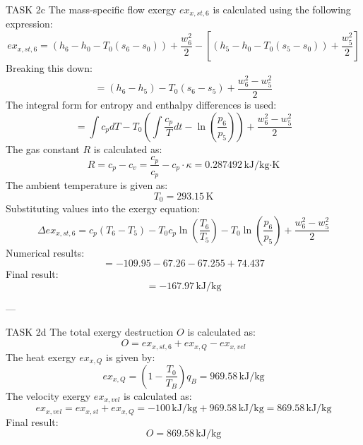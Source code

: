 TASK 2c  
The mass-specific flow exergy \( ex_{x,st,6} \) is calculated using the following expression:  
\[
ex_{x,st,6} = (h_6 - h_0 - T_0(s_6 - s_0)) + \frac{w_6^2}{2} - \left[(h_5 - h_0 - T_0(s_5 - s_0)) + \frac{w_5^2}{2}\right]
\]  
Breaking this down:  
\[
= (h_6 - h_5) - T_0(s_6 - s_5) + \frac{w_6^2 - w_5^2}{2}
\]  
The integral form for entropy and enthalpy differences is used:  
\[
= \int c_p dT - T_0 \left(\int \frac{c_p}{T} dt - \ln\left(\frac{p_6}{p_5}\right)\right) + \frac{w_6^2 - w_5^2}{2}
\]  
The gas constant \( R \) is calculated as:  
\[
R = c_p - c_v = \frac{c_p}{c_p} - c_p \cdot \kappa = 0.287492 \, \text{kJ/kg·K}
\]  
The ambient temperature is given as:  
\[
T_0 = 293.15 \, \text{K}
\]  
Substituting values into the exergy equation:  
\[
\Delta ex_{x,st,6} = c_p(T_6 - T_5) - T_0 c_p \ln\left(\frac{T_6}{T_5}\right) - T_0 \ln\left(\frac{p_6}{p_5}\right) + \frac{w_6^2 - w_5^2}{2}
\]  
Numerical results:  
\[
= -109.95 - 67.26 - 67.255 + 74.437
\]  
Final result:  
\[
= -167.97 \, \text{kJ/kg}
\]  

---

TASK 2d  
The total exergy destruction \( O \) is calculated as:  
\[
O = ex_{x,st,6} + ex_{x,Q} - ex_{x,vel}
\]  
The heat exergy \( ex_{x,Q} \) is given by:  
\[
ex_{x,Q} = \left(1 - \frac{T_0}{T_B}\right) q_B = 969.58 \, \text{kJ/kg}
\]  
The velocity exergy \( ex_{x,vel} \) is calculated as:  
\[
ex_{x,vel} = ex_{x,st} + ex_{x,Q} = -100 \, \text{kJ/kg} + 969.58 \, \text{kJ/kg} = 869.58 \, \text{kJ/kg}
\]  
Final result:  
\[
O = 869.58 \, \text{kJ/kg}
\]  